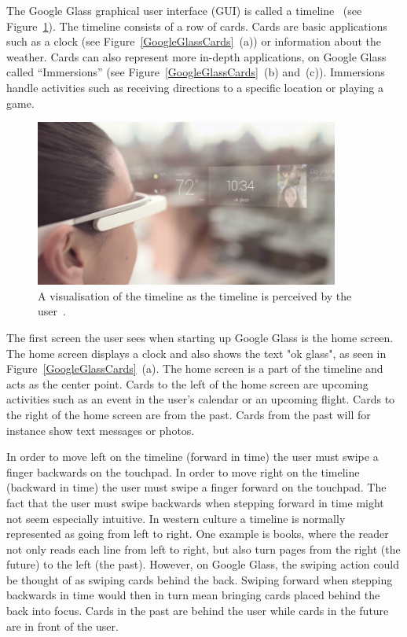 The Google Glass graphical user interface (GUI) is called a timeline~\cite{ImagesGoogleGlassUI} (see Figure~\ref{GoogleGlassUI}). The timeline consists of a row of cards. Cards are basic applications such as a clock (see Figure~\ref{GoogleGlassCards}~(a)) or information about the weather. Cards can also represent more in-depth applications, on Google Glass called ``Immersions'' (see Figure~\ref{GoogleGlassCards}~(b) and~(c)). Immersions handle activities such as receiving directions to a specific location or playing a game.

	\begin{figure}[ht!]
		\centering
		\includegraphics[width=100mm]{images/GoogleGlassUI}
		\caption{A visualisation of the timeline as the timeline is perceived by the user~\cite{ImagesGoogleGlassUI}.}
		\label{GoogleGlassUI}
	\end{figure}

The first screen the user sees when starting up Google Glass is the home screen. The home screen displays a clock and also shows the text "ok glass", as seen in Figure~\ref{GoogleGlassCards}~(a). The home screen is a part of the timeline and acts as the center point. Cards to the left of the home screen are upcoming activities such as an event in the user's calendar or an upcoming flight. Cards to the right of the home screen are from the past. Cards from the past will for instance show text messages or photos.

In order to move left on the timeline (forward in time) the user must swipe a finger backwards on the touchpad. In order to move right on the timeline (backward in time) the user must swipe a finger forward on the touchpad. The fact that the user must swipe backwards when stepping forward in time might not seem especially intuitive. In western culture a timeline is normally represented as going from left to right. One example is books, where the reader not only reads each line from left to right, but also turn pages from the right (the future) to the left (the past). However, on Google Glass, the swiping action could be thought of as swiping cards behind the back. Swiping forward when stepping backwards in time would then in turn mean bringing cards placed behind the back into focus. Cards in the past are behind the user while cards in the future are in front of the user.


